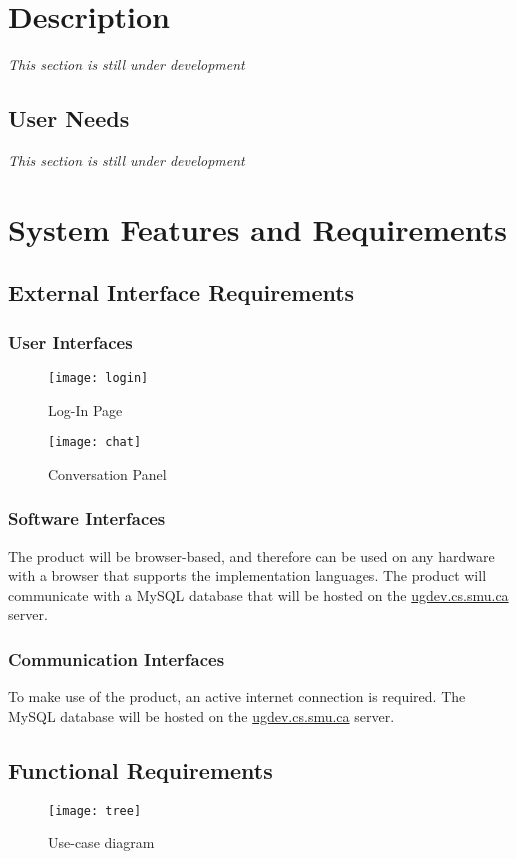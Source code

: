 \documentclass[11pt]{article}
\begin{document}
\section{Description}
\textit{This section is still under development}\\\blindtext
\subsection{User Needs}
\textit{This section is still under development}\\\blindtext
\section{System Features and Requirements}
\subsection{External Interface Requirements}
\subsubsection{User Interfaces}

\begin{figure}[!htb]
  \texttt{[image: login]}
  \caption{Log-In Page}
  \texttt{[image: chat]}
  \caption{Conversation Panel}
\end{figure}

\subsubsection{Software Interfaces}
The product will be browser-based, and therefore can be used on any hardware with a browser that
supports the implementation languages. The product will communicate with a MySQL database that will
be hosted on the \url{ugdev.cs.smu.ca} server.

\subsubsection{Communication Interfaces}
To make use of the product, an active internet connection is required. The MySQL database will be
hosted on the \url{ugdev.cs.smu.ca} server.

\subsection{Functional Requirements}

\begin{figure}[!htb]
  \texttt{[image: tree]}
  \caption{Use-case diagram}
\end{figure}
\end{document}
